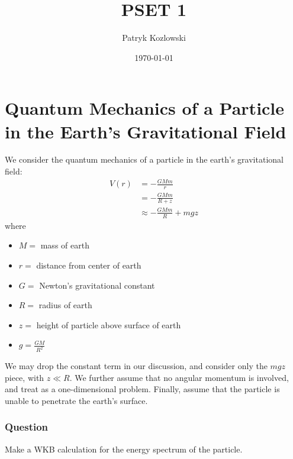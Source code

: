 \documentclass{article}[16pt]
\title{PSET 1}
\author{Patryk Kozlowski}
\date{\today}
\begin{document}
\maketitle


\section{Quantum Mechanics of a Particle in the Earth's Gravitational Field}
We consider the quantum mechanics of a particle in the earth's gravitational field:
\begin{align*}
    V(r) &= -\frac{GMm}{r} \\
    &= -\frac{GMm}{R + z} \\
    &\approx -\frac{GMm}{R} + mgz
\end{align*}
where
\begin{itemize}
    \item $M =$ mass of earth
    \item $r =$ distance from center of earth
    \item $G =$ Newton's gravitational constant
    \item $R =$ radius of earth
    \item $z =$ height of particle above surface of earth
    \item $g = \frac{GM}{R^2}$
\end{itemize}
We may drop the constant term in our discussion, and consider only the $mgz$ piece, with $z \ll R$. We further assume that no angular momentum is involved, and treat 
as a one-dimensional problem. Finally, assume that the particle is unable to penetrate the earth's surface.

\subsubsection{Question}
Make a WKB calculation for the energy spectrum of the particle.
\end{document}
